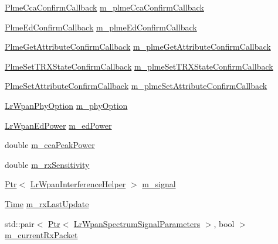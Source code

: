 \begin{DoxyCompactItemize}
\item 
\hyperlink{group__lr-wpan_gafd859f54b5982ab4c85838a40b1c7340}{Plme\+Cca\+Confirm\+Callback} \hyperlink{classns3_1_1LrWpanPhy_a3b75b533222419589c396380e8305bb9}{m\+\_\+plme\+Cca\+Confirm\+Callback}
\item 
\hyperlink{group__lr-wpan_gadecf12d559c4db545036668cf9a384b6}{Plme\+Ed\+Confirm\+Callback} \hyperlink{classns3_1_1LrWpanPhy_a5cf7d4aaf1889772a711a2e83fb39eca}{m\+\_\+plme\+Ed\+Confirm\+Callback}
\item 
\hyperlink{group__lr-wpan_ga024ef2b58b799155fc114f3d895ca283}{Plme\+Get\+Attribute\+Confirm\+Callback} \hyperlink{classns3_1_1LrWpanPhy_abc174686fae5652243dca022df5af6ed}{m\+\_\+plme\+Get\+Attribute\+Confirm\+Callback}
\item 
\hyperlink{group__lr-wpan_ga65eacebda6dc7c1611bea032c5a525a7}{Plme\+Set\+T\+R\+X\+State\+Confirm\+Callback} \hyperlink{classns3_1_1LrWpanPhy_ab3fed0e994f9e51e765c704f1a7b666f}{m\+\_\+plme\+Set\+T\+R\+X\+State\+Confirm\+Callback}
\item 
\hyperlink{group__lr-wpan_gab86861c72f1d605df34795c411122e68}{Plme\+Set\+Attribute\+Confirm\+Callback} \hyperlink{classns3_1_1LrWpanPhy_a174646782f62d874a5c92f4cfbbb8922}{m\+\_\+plme\+Set\+Attribute\+Confirm\+Callback}
\item 
\hyperlink{group__lr-wpan_ga23ee18bb5f5136211c75a7f58673db52}{Lr\+Wpan\+Phy\+Option} \hyperlink{classns3_1_1LrWpanPhy_a7c89aea4498cefc0bdc2284526f0019b}{m\+\_\+phy\+Option}
\item 
\hyperlink{structns3_1_1LrWpanEdPower}{Lr\+Wpan\+Ed\+Power} \hyperlink{classns3_1_1LrWpanPhy_a63a7ca8192b16aa1d4ea320c1a43452f}{m\+\_\+ed\+Power}
\item 
double \hyperlink{classns3_1_1LrWpanPhy_a7b801d5943cf39ea427eb3cfd036166e}{m\+\_\+cca\+Peak\+Power}
\item 
double \hyperlink{classns3_1_1LrWpanPhy_a8150b66561c973e8d0f9ef77bac739b8}{m\+\_\+rx\+Sensitivity}
\item 
\hyperlink{classns3_1_1Ptr}{Ptr}$<$ \hyperlink{classns3_1_1LrWpanInterferenceHelper}{Lr\+Wpan\+Interference\+Helper} $>$ \hyperlink{classns3_1_1LrWpanPhy_a923130b0bacef678012bcc8fdc68fd10}{m\+\_\+signal}
\item 
\hyperlink{classns3_1_1Time}{Time} \hyperlink{classns3_1_1LrWpanPhy_ada4772165b76d85314ecbc3c19a404ab}{m\+\_\+rx\+Last\+Update}
\item 
std\+::pair$<$ \hyperlink{classns3_1_1Ptr}{Ptr}$<$ \hyperlink{structns3_1_1LrWpanSpectrumSignalParameters}{Lr\+Wpan\+Spectrum\+Signal\+Parameters} $>$, bool $>$ \hyperlink{classns3_1_1LrWpanPhy_a5e25bc6b183652edc17015d04cca92a3}{m\+\_\+current\+Rx\+Packet}

\end{DoxyCompactItemize}

